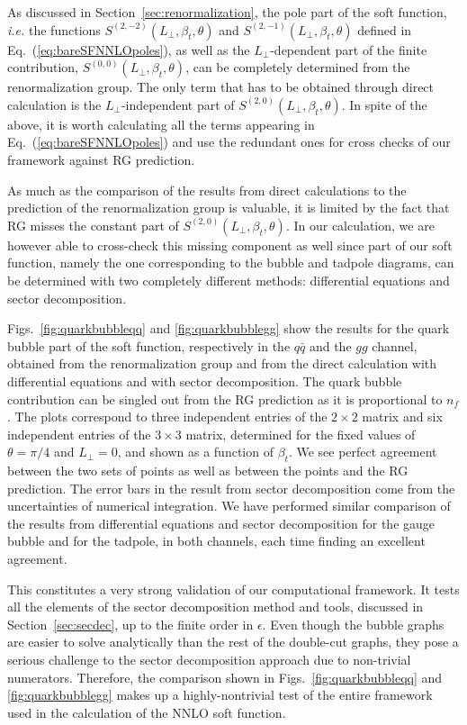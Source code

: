 \documentclass[a4paper,11pt]{article}
\newcommand{\qqbar}{{\ensuremath{q \bar q}}\xspace}
\newcommand{\ie}{{\it i.e. }}
\newcommand{\LT}{L_\perp}
\numberwithin{equation}{section}
\begin{document}
As discussed in Section~\ref{sec:renormalization}, the pole part of the soft
function, \ie the functions $S^{(2,-2)}(\LT, \beta_t,\theta)$ and
$S^{(2,-1)}(\LT, \beta_t,\theta)$ defined in Eq.~(\ref{eq:bareSFNNLOpoles}), as
well as the $\LT$-dependent part of the finite contribution, $S^{(0,0)}(\LT,
\beta_t,\theta)$, can be completely determined from the renormalization group. 
%
The only term that has to be obtained through direct calculation is the
$\LT$-independent part of $S^{(2,0)}(\LT, \beta_t,\theta)$. 
%
In spite of the above, it is worth calculating all the terms appearing in
Eq.~(\ref{eq:bareSFNNLOpoles}) and use the
redundant ones for cross checks of our framework against RG prediction.

As much as the comparison of the results from direct calculations to the
prediction of the renormalization group is valuable, it is limited by the fact
that RG misses the constant part of $S^{(2,0)}(\LT, \beta_t,\theta)$. In our
calculation, we are however able to cross-check this missing component as well
since part of our soft function, namely the one corresponding to the bubble and
tadpole diagrams, can be determined with two completely different methods:
differential equations and sector decomposition.


Figs.~\ref{fig:quarkbubbleqq} and \ref{fig:quarkbubblegg} show the results for
the quark bubble part of the soft function, respectively in the \qqbar and the
$gg$ channel, obtained from the renormalization group and from the direct
calculation with differential equations and with sector decomposition. 
%
The quark bubble contribution can be singled out from the RG prediction as it is
proportional to $n_f$.
%
The plots correspond to three independent entries of the $2\times 2$ matrix and
six independent entries of the $3\times 3$ matrix, determined for the fixed
values of $\theta = \pi/4$ and $\LT = 0$, and shown as a function of $\beta_t$.
We see perfect agreement between the two sets of points as well as between the
points and the RG prediction.  The error bars in the result from sector
decomposition come from the uncertainties of numerical integration. 
%
We have performed similar comparison of the results from differential equations
and sector decomposition for the gauge bubble and for the tadpole, in both
channels, each time finding an excellent agreement.

This constitutes a very strong validation of our computational framework. It
tests all the elements of the sector decomposition method and tools, discussed
in Section~\ref{sec:secdec}, up to the finite order in $\epsilon$. Even though
the bubble graphs are easier to solve analytically than the rest of the
double-cut graphs, they pose a serious challenge to the sector decomposition
approach due to non-trivial numerators. Therefore, the comparison shown in
Figs.~\ref{fig:quarkbubbleqq} and \ref{fig:quarkbubblegg} makes up a
highly-nontrivial test of the entire framework used in the calculation of the
NNLO soft function.
\end{document}
